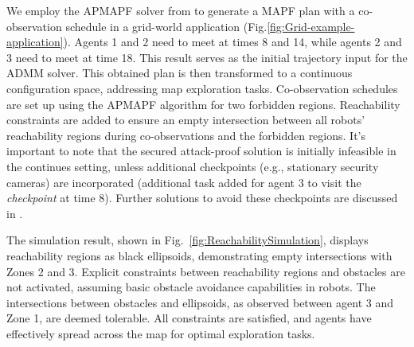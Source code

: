 \documentclass[10pt,twocolumn,twoside]{IEEEtran}
\begin{document}
We employ the APMAPF solver from \cite{wardega2019resilience} to generate a MAPF plan with a co-observation schedule in a grid-world application (Fig.\ref{fig:Grid-example-application}). Agents 1 and 2 need to meet at times 8 and 14, while agents 2 and 3 need to meet at time 18. This result serves as the initial trajectory input for the ADMM solver. This obtained plan is then transformed to a continuous configuration space, addressing map exploration tasks. Co-observation schedules are set up using the APMAPF algorithm for two forbidden regions. Reachability constraints are added to ensure an empty intersection between all robots' reachability regions during co-observations and the forbidden regions. It's important to note that the secured attack-proof solution is initially infeasible in the continues setting, unless additional checkpoints (e.g., stationary security cameras) are incorporated (additional task added for agent 3 to visit the \emph{checkpoint} at time $8$). Further solutions to avoid these checkpoints are discussed in .

The simulation result, shown in Fig.~\ref{fig:ReachabilitySimulation}, displays reachability regions as black ellipsoids, demonstrating empty intersections with Zones 2 and 3. Explicit constraints between reachability regions and obstacles are not activated, assuming basic obstacle avoidance capabilities in robots. The intersections between obstacles and ellipsoids, as observed between agent 3 and Zone 1, are deemed tolerable. All constraints are satisfied, and agents have effectively spread across the map for optimal exploration tasks.


\end{document}
